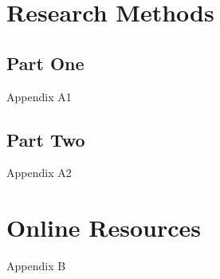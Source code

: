 \documentclass[sigconf,usenames,dvipsnames,svgnames,table]{acmart}
\begin{document}



\appendix

\section{Research Methods}

\subsection{Part One}

Appendix A1

\subsection{Part Two}

Appendix A2

\section{Online Resources}

Appendix B
\end{document}
